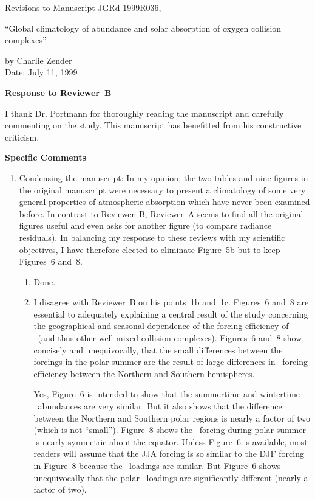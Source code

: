 \documentclass[12pt,twoside]{article}
\begin{document}
 
\noindent
Revisions to Manuscript JGRd-1999R036, \\
\begin{center}\normalsize
``Global climatology of abundance and solar absorption of oxygen
collision complexes'' 
\end{center}
\medskip\noindent
by Charlie Zender \\
\medskip\noindent
Date: July 11, 1999

\medskip\noindent\textbf{Response to Reviewer~B}\medskip

I thank Dr. Portmann for thoroughly reading the manuscript and
carefully commenting on the study.
This manuscript has benefitted from his constructive criticism. 

\medskip\noindent\textbf{Specific Comments}

\begin{enumerate}
\item Condensing the manuscript: In my opinion, the two tables and
nine figures in the original manuscript were necessary to present a
climatology of some very general properties of atmospheric absorption
which have never been examined before.
In contrast to Reviewer~B, Reviewer~A seems to find all the original
figures useful and even asks for another figure (to compare radiance
residuals). 
In balancing my response to these reviews with my scientific
objectives, I have therefore elected to eliminate Figure~5b but to
keep Figures~6 and~8.
\begin{enumerate}
\item Done.
\item I disagree with Reviewer~B on his points~1b and~1c.
Figures~6 and~8 are essential to adequately explaining a central
result of the study concerning the geographical and seasonal
dependence of the forcing efficiency of \OdX\ (and thus other well
mixed collision complexes).
Figures~6 and~8 show, concisely and unequivocally, that the small
differences between the forcings in the polar summer are the result of
large differences in \OdX\ forcing efficiency between the Northern and
Southern hemispheres. 

Yes, Figure~6 is intended to show that the summertime and wintertime
\OdX\ abundances are very similar.  
But it also shows that the difference between the Northern and
Southern polar regions is nearly a factor of two (which is not
``small''). 
Figure~8 shows the \OdX\ forcing during polar summer is nearly
symmetric about the equator.
Unless Figure~6 is available, most readers will assume that the
JJA forcing is so similar to the DJF forcing in Figure~8 because the
\OdX\ loadings are similar. 
But Figure~6 shows unequivocally that the polar \OdX\ loadings are
significantly different (nearly a factor of two).


\end{enumerate}
\end{enumerate}
\end{document}
